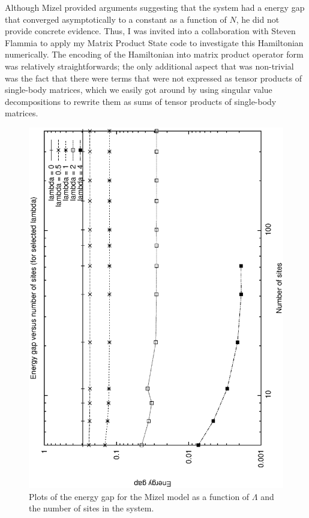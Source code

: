 \documentclass[12pt]{amsbook}
\theoremstyle{plain}
\theoremstyle{definition}
\theoremstyle{remark}
\begin{document}
Although Mizel provided arguments suggesting that the system had a  energy gap that converged asymptotically to a constant as a function of $N$, he did not provide concrete evidence.  Thus, I was invited into a collaboration with Steven Flammia to apply my Matrix Product State code to investigate this Hamiltonian numerically.   The encoding of the Hamiltonian into matrix product operator form was relatively straightforwards;  the only additional aspect that was non-trivial was the fact that there were terms that were not expressed as tensor products of single-body matrices, which we easily got around by using singular value decompositions to rewrite them as sums of tensor products of single-body matrices.

\begin{figure}
\includegraphics[width=\columnwidth]{images/mizel}
\caption{Plots of the energy gap for the Mizel model as a function of $\Lambda$ and the number of sites in the system.}
\label{plot:mizel}
\end{figure}
\end{document}
